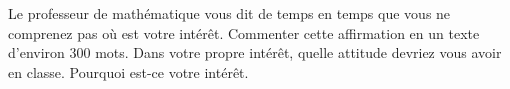 
\begin{exercice}\label{exosmath-0463}

    Le professeur de mathématique vous dit de temps en temps que vous ne comprenez pas où est votre intérêt. Commenter cette affirmation en un texte d'environ \( 300\) mots. Dans votre propre intérêt, quelle attitude devriez vous avoir en classe. Pourquoi est-ce votre intérêt.

\end{exercice}

